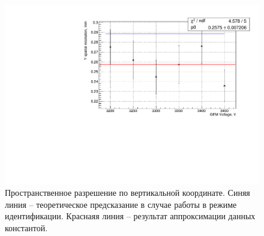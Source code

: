 \begin{figure}[h]
	\centering
	\includegraphics[width= 12cm]{img/y_sp_res.pdf}
	\caption{Пространственное разрешение по вертикальной координате. Синяя линия -- теоретическое предсказание в случае работы в режиме идентификации. Краснаяя линия -- результат аппроксимации данных константой.}
	\label{fig:y_sp_res}
\end{figure}